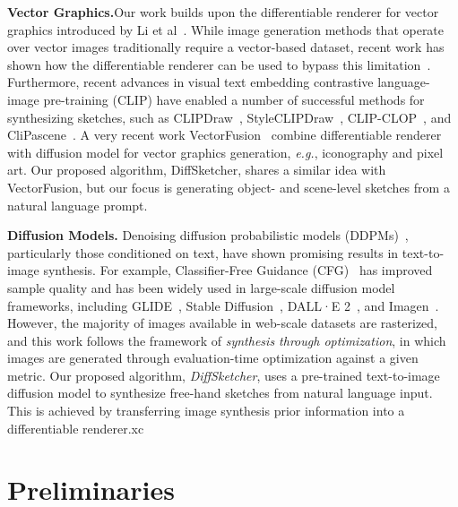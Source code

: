 \documentclass{article}
\begin{document}
\noindent\textbf{Vector Graphics.}\quad Our work builds upon the differentiable renderer for vector graphics introduced by Li et al~\cite{Li_2020_diffvg}. While image generation methods that operate over vector images traditionally require a vector-based dataset, recent work has shown how the differentiable renderer can be used to bypass this limitation~\cite{clipgen_shen_2021,rethinking_kotovenko_2021, evolution_tian_2022, im2vec_reddy_2021, Ma_2022_LIVE}. Furthermore, recent advances in visual text embedding contrastive language-image pre-training (CLIP)\cite{clip_radford_2021} have enabled a number of successful methods for synthesizing sketches, such as CLIPDraw~\cite{clipdraw_frans_2022}, StyleCLIPDraw~\cite{Styleclipdraw_schaldenbr_2021}, CLIP-CLOP~\cite{clipclop_mirowski_2022}, and CliPascene~\cite{clipascene_vinker_2022}. A very recent work VectorFusion~\cite{jain2022vectorfusion} combine differentiable renderer with diffusion model for vector graphics generation, \textit{e.g.}, iconography and pixel art. Our proposed algorithm, DiffSketcher, shares a similar idea with VectorFusion, but our focus is generating object- and scene-level sketches from a natural language prompt.

\noindent\textbf{Diffusion Models.} Denoising diffusion probabilistic models (DDPMs)~\cite{diffusion_models_dickstein_2015,EestGrad_song_2019,ddpm_ho_2020,scorebased_song_2021}, particularly those conditioned on text, have shown promising results in text-to-image synthesis. For example, Classifier-Free Guidance (CFG)~\cite{classifierfree_2022_ho} has improved sample quality and has been widely used in large-scale diffusion model frameworks, including GLIDE~\cite{GLIDE_2022_nichol}, Stable Diffusion~\cite{ldm_2022_Rombach}, DALL·E 2~\cite{DALLE2_2022_ramesh}, and Imagen~\cite{imagen_2022_saharia}. However, the majority of images available in web-scale datasets are rasterized, and this work follows the framework of \textit{synthesis through optimization}, in which images are generated through evaluation-time optimization against a given metric. Our proposed algorithm, \textit{DiffSketcher}, uses a pre-trained text-to-image diffusion model to synthesize free-hand sketches from natural language input. This is achieved by transferring image synthesis prior information into a differentiable renderer.xc

\section{Preliminaries}
\end{document}
